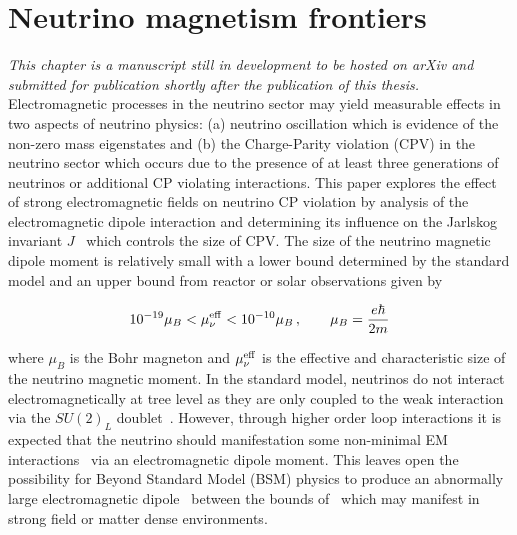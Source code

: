 \chapter{Neutrino magnetism frontiers}
\label{chap:neutrino}
\noindent \emph{This chapter is a manuscript still in development to be hosted on arXiv and submitted for publication shortly after the publication of this thesis.}\\

\noindent Electromagnetic processes in the neutrino sector may yield measurable effects in two aspects of neutrino physics: (a) neutrino oscillation which is evidence of the non-zero mass eigenstates and (b) the Charge-Parity violation (CPV) in the neutrino sector which occurs due to the presence of at least three generations of neutrinos or additional CP violating interactions. This paper explores the effect of strong electromagnetic fields on neutrino CP violation by analysis of the electromagnetic dipole interaction and determining its influence on the Jarlskog invariant $J$~\citep{jarlskog1985basis,jarlskog1985commutator,jarlskog2005invariants} which controls the size of CPV. The size of the neutrino magnetic dipole moment is relatively small with a lower bound determined by the standard model and an upper bound from reactor or solar observations given by~\citep{alexander2016status,canas2016updating,sierra2022neutrino}

\begin{align}
    \label{momentbound:1}
    10^{-19}\mu_{B}<\mu_{\nu}^{\rm eff}<10^{-10}\mu_{B}\,,\qquad\mu_{B}=\frac{e\hbar}{2m}
\end{align}

where $\mu_{B}$ is the Bohr magneton and $\mu_{\nu}^{\rm eff}$ is the effective and characteristic size of the neutrino magnetic moment. In the standard model, neutrinos do not interact electromagnetically at tree level as they are only coupled to the weak interaction via the $SU(2)_{L}$ doublet~\citep{schwartz2014quantum}. However, through higher order loop interactions it is expected that the neutrino should manifestation some non-minimal EM interactions~\citep{shrock1980new,abi2021prospects} via an electromagnetic dipole moment. This leaves open the possibility for Beyond Standard Model (BSM) physics to produce an abnormally large electromagnetic dipole~\citep{giunti2015neutrino,lindner2017revisiting,brdar2021neutrino} between the bounds of~ which may manifest in strong field or matter dense environments.

